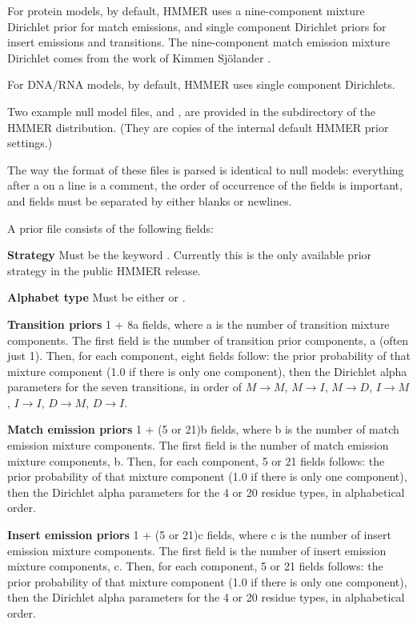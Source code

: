 For protein models, by default, HMMER uses a nine-component mixture
Dirichlet prior for match emissions, and single component Dirichlet
priors for insert emissions and transitions. The nine-component match
emission mixture Dirichlet comes from the work of Kimmen Sj\"{o}lander
\cite{Sjolander96}.

For DNA/RNA models, by default, HMMER uses single component
Dirichlets.

Two example null model files,
 and , are provided
in the  subdirectory of the HMMER distribution. (They are
copies of the internal default HMMER prior settings.)

The way the format of these files is parsed is identical to null
models: everything after a \prog{\#} on a line is a comment, the order
of occurrence of the fields is important, and fields must be separated
by either blanks or newlines.

A prior file consists of the following fields:

\begin{wideitem}
\item [\textbf{Strategy}] Must be the keyword . Currently 
this is the only available prior strategy in the public HMMER release.

\item [\textbf{Alphabet type}] Must be either  or
.

\item [\textbf{Transition priors}] 1 + 8a fields, where a
is the number of transition mixture components. The first field is the
number of transition prior components, a (often just 1). Then, for each
component, eight fields follow: the prior probability of that mixture
component (1.0 if there is only one component), then the Dirichlet
alpha parameters for the seven transitions, in order of $M \rightarrow
M$, $M \rightarrow I$, $M \rightarrow D$, $I \rightarrow M$, $I
\rightarrow I$, $D \rightarrow M$, $D \rightarrow I$.

\item [\textbf{Match emission priors}] 1 + (5 or 21)b fields,
where b is the number of match emission mixture components.  The first
field is the number of match emission mixture components, b. Then, for
each component, 5 or 21 fields follows: the prior probability of that
mixture component (1.0 if there is only one component), then the
Dirichlet alpha parameters for the 4 or 20 residue types, in
alphabetical order.

\item [\textbf{Insert emission priors}] 1 + (5 or 21)c fields,
where c is the number of insert emission mixture components.  The
first field is the number of insert emission mixture components,
c. Then, for each component, 5 or 21 fields follows: the prior
probability of that mixture component (1.0 if there is only one
component), then the Dirichlet alpha parameters for the 4 or 20
residue types, in alphabetical order.
\end{wideitem}

